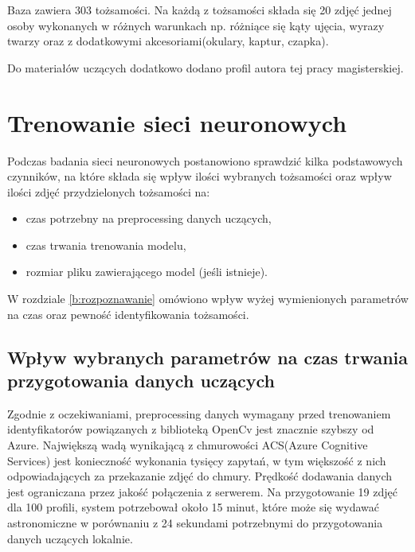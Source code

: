 Baza zawiera 303 tożsamości. Na każdą z tożsamości składa się 20 zdjęć jednej osoby wykonanych w różnych warunkach np. różniące się kąty ujęcia, wyrazy twarzy oraz z dodatkowymi akcesoriami(okulary, kaptur, czapka). 

Do materiałów uczących dodatkowo dodano profil autora tej pracy magisterskiej.

\section{Trenowanie sieci neuronowych}
Podczas badania sieci neuronowych postanowiono sprawdzić kilka podstawowych czynników, na które składa się wpływ ilości wybranych tożsamości oraz wpływ ilości zdjęć przydzielonych tożsamości na:
\begin{itemize}
\item czas potrzebny na preprocessing danych uczących,
\item czas trwania trenowania modelu,
\item rozmiar pliku zawierającego model (jeśli istnieje).
\end{itemize}
W rozdziale \ref{b:rozpoznawanie} omówiono wpływ wyżej wymienionych parametrów na czas oraz pewność identyfikowania tożsamości.

\subsection{Wpływ wybranych parametrów na czas trwania przygotowania danych uczących}
Zgodnie z oczekiwaniami, preprocessing danych wymagany przed trenowaniem identyfikatorów powiązanych z biblioteką OpenCv jest znacznie szybszy od Azure. Największą wadą wynikającą z chmurowości  ACS(Azure Cognitive Services) jest konieczność wykonania tysięcy zapytań, w tym większość z nich odpowiadających za przekazanie zdjęć do chmury. Prędkość dodawania danych jest ograniczana przez jakość połączenia z serwerem. Na przygotowanie 19 zdjęć dla 100 profili, system potrzebował około 15 minut, które może się wydawać astronomiczne w porównaniu z 24 sekundami potrzebnymi do przygotowania danych uczących lokalnie.

